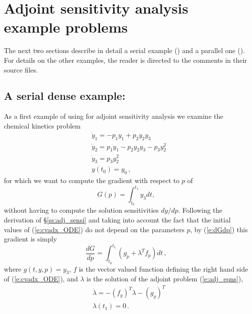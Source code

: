 \section{Adjoint sensitivity analysis example problems}\label{s:adj_examples}

The next two sections describe in detail a serial example () and
a parallel one (). For details on the other examples, the reader is
directed to the comments in their source files.

\subsection{A serial dense example: }\label{ss:cvadx}

As a first example of using {\cvodes} for adjoint sensitivity analysis
we examine the chemical kinetics problem 
\begin{equation}\label{e:cvadx_ODE}
  \begin{split}
    &{\dot y}_1 = -p_1 y_1 + p_2 y_2 y_3   \\
    &{\dot y}_2 =  p_1 y_1 - p_2 y_2 y_3 - p_3 y_2^2 \\
    &{\dot y}_3 =  p_3 y_2^2 \\
    &y(t_0) = y_0 \, ,
  \end{split}
\end{equation}
for which we want to compute the gradient with respect to $p$ of 
\begin{equation}\label{e:cvadx_G}
  G(p) = \int_{t_0}^{t_1}  y_3  dt ,
\end{equation}
without having to compute the solution sensitivities ${dy}/{dp}$.
Following the derivation of \S\ref{ss:adj_sensi} and taking into account
the fact that the initial values of (\ref{e:cvadx_ODE}) do not depend on 
the parameters $p$, by (\ref{e:dGdp}) this gradient is simply
\begin{equation}\label{e:cvadx_dGdp}
\frac{dG}{dp} = \int_{t_0}^{t_1} 
\left( g_p + \lambda^T f_p \right) dt \, ,
\end{equation}
where $g(t,y,p) = y_3$, $f$ is the vector valued function 
defining the right hand side of (\ref{e:cvadx_ODE}), and $\lambda$ is 
the solution of the adjoint problem (\ref{e:adj_eqns}),
\begin{equation}\label{e:cvadx_ADJ}
  \begin{split}
    &{\dot \lambda} = - (f_y)^T  \lambda - (g_y)^T \\
    &\lambda(t_1) = 0 \, .
  \end{split}
\end{equation}

